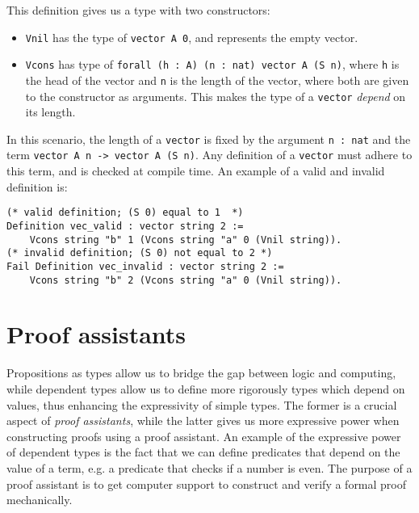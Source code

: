 This definition gives us a type with two constructors:

\begin{itemize}
    \item
        \lstinline{Vnil} has the type of \lstinline{vector A 0}, and represents the empty vector.
    \item
        \lstinline{Vcons} has type of \lstinline{forall (h : A) (n : nat) vector A (S n)}, where \lstinline{h}
                            is the head of the vector and \lstinline{n} is the length of the vector,
                            where both are given to the constructor as arguments.
                            This makes the type of a \lstinline{vector} \textit{depend} on its length.
\end{itemize}

In this scenario, the length of a \lstinline{vector} is fixed by the argument \lstinline{n : nat}
and the term \lstinline{vector A n -> vector A (S n)}.
Any definition of a \lstinline{vector} must adhere to this term, and is checked at compile time.
An example of a valid and invalid definition is:

\begin{minipage}{\linewidth}
\begin{lstlisting}[language=Coq, label={lst:dep_type_vec_ex}, caption={Examples of vectors in Coq}]
(* valid definition; (S 0) equal to 1  *)
Definition vec_valid : vector string 2 :=
    Vcons string "b" 1 (Vcons string "a" 0 (Vnil string)).
(* invalid definition; (S 0) not equal to 2 *)
Fail Definition vec_invalid : vector string 2 :=
    Vcons string "b" 2 (Vcons string "a" 0 (Vnil string)).
\end{lstlisting}
\end{minipage}

\section{Proof assistants}
\label{sec:proof_assistants}

Propositions as types allow us to bridge the gap between logic and computing,
while dependent types allow us to define more rigorously types which depend on values,
thus enhancing the expressivity of simple types.
The former is a crucial aspect of \textit{proof assistants}, while the latter gives
us more expressive power when constructing proofs using a proof assistant.
An example of the expressive power of dependent types is the fact that we can define
predicates that depend on the value of a term, e.g. a predicate that checks if a number is even.
The purpose of a proof assistant is to get computer support to construct and verify a formal proof mechanically.

